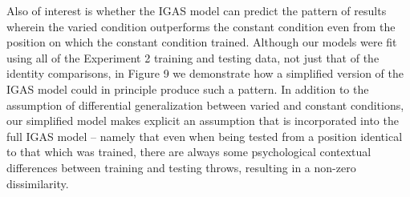 \documentclass[
  jou, donotrepeattitle,floatsintext]{apa7}
\begin{document}
Also of interest is whether the IGAS model can predict the pattern of results wherein the varied condition outperforms the constant condition even from the position on which the constant condition trained. Although our models were fit using all of the Experiment 2 training and testing data, not just that of the identity comparisons, in Figure 9 we demonstrate how a simplified version of the IGAS model could in principle produce such a pattern. In addition to the assumption of differential generalization between varied and constant conditions, our simplified model makes explicit an assumption that is incorporated into the full IGAS model -- namely that even when being tested from a position identical to that which was trained, there are always some psychological contextual differences between training and testing throws, resulting in a non-zero dissimilarity.
\end{document}
